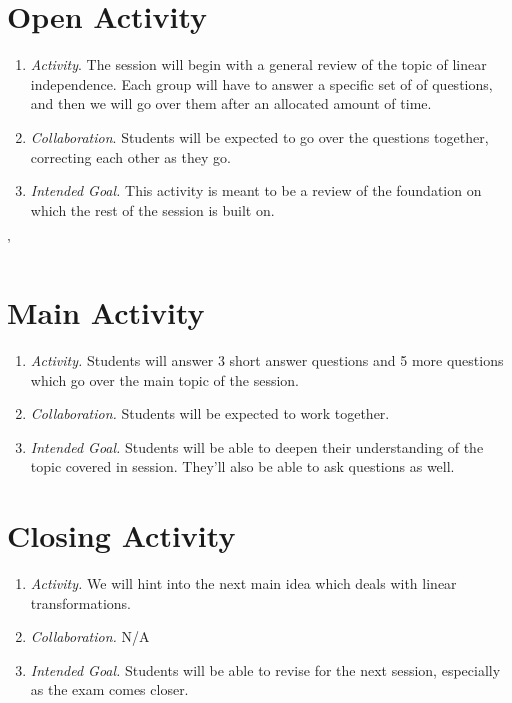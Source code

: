 \documentclass[11pt]{article}
\begin{document}
\newpage
{}
\section{\centering Open Activity}
	\begin{enumerate}
		\item \textit{Activity}. The session will begin with a general review of the topic of linear independence. Each group will have to answer a specific set of
			of questions, and then we will go over them after an allocated amount of time.
		\item \textit{Collaboration}. Students will be expected to go over the questions together, correcting each other as they go.
		\item \textit{Intended Goal.} This activity is meant to be a review of the foundation on which the rest of the session is built on.
	\end{enumerate}'

\section{\centering Main Activity}
	\begin{enumerate}
		\item \textit{Activity.} Students will answer 3 short answer questions and 5 more questions which go over the main topic of the session.
		\item \textit{Collaboration.} Students will be expected to work together.
		\item \textit{Intended Goal.} Students will be able to deepen their understanding of the topic covered in session. They'll also be able to ask questions 
			as well.
	\end{enumerate}
\section{\centering Closing Activity}
	\begin{enumerate}
		\item \textit{Activity.} We will hint into the next main idea which deals with linear transformations.
		\item \textit{Collaboration.} N/A
		\item \textit{Intended Goal.} Students will be able to revise for the next session, especially as the exam comes closer. 
	\end{enumerate}

\newpage
{}
\end{document}
